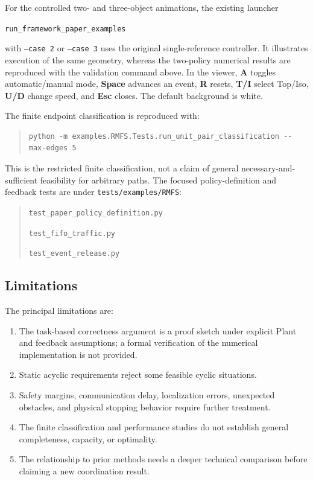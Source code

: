 \documentclass[11pt,a4paper]{article}
\theoremstyle{remark}
\begin{document}
For the controlled two- and three-object animations, the existing launcher
\par\noindent\nolinkurl{run_framework_paper_examples}\par\noindent with \texttt{--case 2} or \texttt{--case 3}
uses the original single-reference controller. It illustrates execution of
the same geometry, whereas the two-policy numerical results are reproduced
with the validation command above. In the viewer, \textbf{A} toggles
automatic/manual mode, \textbf{Space} advances an event, \textbf{R} resets,
\textbf{T/I} select Top/Iso, \textbf{U/D} change speed, and \textbf{Esc}
closes. The default background is white.

The finite endpoint classification is reproduced with:
\begin{quote}\small\begin{verbatim}
python -m examples.RMFS.Tests.run_unit_pair_classification --max-edges 5
\end{verbatim}\end{quote}
This is the restricted finite classification, not a claim of general
necessary-and-sufficient feasibility for arbitrary paths.
The focused policy-definition and feedback tests are under
\nolinkurl{tests/examples/RMFS}:
\begin{quote}\small
\nolinkurl{test_paper_policy_definition.py}\par
\nolinkurl{test_fifo_traffic.py}\par
\nolinkurl{test_event_release.py}
\end{quote}

\subsection{Limitations}

The principal limitations are:
\begin{enumerate}
\item The task-based correctness argument is a proof sketch under explicit
      Plant and feedback assumptions; a formal verification of the numerical
      implementation is not provided.
\item Static acyclic requirements reject some feasible cyclic situations.
\item Safety margins, communication delay, localization errors, unexpected
      obstacles, and physical stopping behavior require further treatment.
\item The finite classification and performance studies do not establish
      general completeness, capacity, or optimality.
\item The relationship to prior methods needs a deeper technical comparison
      before claiming a new coordination result.
\end{enumerate}
\end{document}
